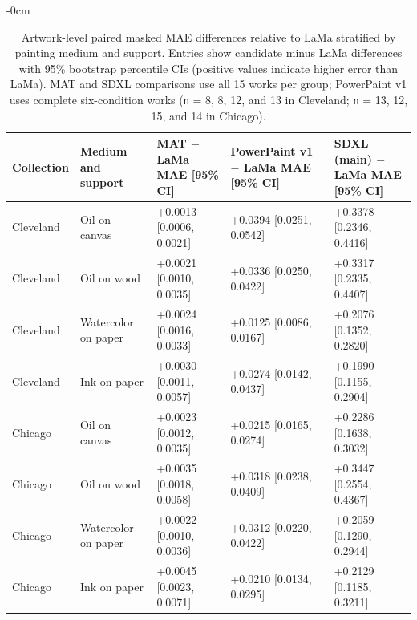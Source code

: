 \documentclass[applsci,article,submit,pdftex,moreauthors]{Definitions/mdpi}
\begin{document}
\begin{table}[!htbp]
\caption{Artwork-level paired masked MAE differences relative to LaMa stratified by painting medium and support. Entries show candidate minus LaMa differences with 95\% bootstrap percentile CIs (positive values indicate higher error than LaMa). MAT and SDXL comparisons use all 15 works per group; PowerPaint v1 uses complete six-condition works (\texttt{n} = 8, 8, 12, and 13 in Cleveland; \texttt{n} = 13, 12, 15, and 14 in Chicago).}\label{table:7}
\begin{adjustwidth}{-\extralength}{0cm}
\centering
\fontsize{8.5}{10.5}\selectfont
\setlength{\tabcolsep}{3pt}
\renewcommand{\arraystretch}{1.2}
\begin{tabular}{>{\raggedright\arraybackslash}p{}>{\raggedright\arraybackslash}p{}>{\raggedright\arraybackslash}p{}>{\raggedright\arraybackslash}p{}>{\raggedright\arraybackslash}p{}}
\toprule
\textbf{Collection} & \textbf{Medium and support} & \textbf{MAT \ensuremath{-} LaMa MAE [95\% CI]} & \textbf{PowerPaint v1 \ensuremath{-} LaMa MAE [95\% CI]} & \textbf{SDXL (main) \ensuremath{-} LaMa MAE [95\% CI]} \\
\midrule
Cleveland & Oil on canvas & +0.0013 [0.0006, 0.0021] & +0.0394 [0.0251, 0.0542] & +0.3378 [0.2346, 0.4416] \\
Cleveland & Oil on wood & +0.0021 [0.0010, 0.0035] & +0.0336 [0.0250, 0.0422] & +0.3317 [0.2335, 0.4407] \\
Cleveland & Watercolor on paper & +0.0024 [0.0016, 0.0033] & +0.0125 [0.0086, 0.0167] & +0.2076 [0.1352, 0.2820] \\
Cleveland & Ink on paper & +0.0030 [0.0011, 0.0057] & +0.0274 [0.0142, 0.0437] & +0.1990 [0.1155, 0.2904] \\
Chicago & Oil on canvas & +0.0023 [0.0012, 0.0035] & +0.0215 [0.0165, 0.0274] & +0.2286 [0.1638, 0.3032] \\
Chicago & Oil on wood & +0.0035 [0.0018, 0.0058] & +0.0318 [0.0238, 0.0409] & +0.3447 [0.2554, 0.4367] \\
Chicago & Watercolor on paper & +0.0022 [0.0010, 0.0036] & +0.0312 [0.0220, 0.0422] & +0.2059 [0.1290, 0.2944] \\
Chicago & Ink on paper & +0.0045 [0.0023, 0.0071] & +0.0210 [0.0134, 0.0295] & +0.2129 [0.1185, 0.3211] \\
\bottomrule
\end{tabular}
\end{adjustwidth}
\end{table}
\end{document}
